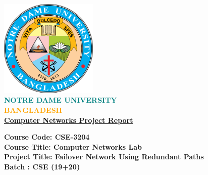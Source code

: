\documentclass[12pt]{report}
\begin{document}
\begin{titlepage}					%
\begin{center}
    \includegraphics[width=0.35\textwidth]{pictures/logo.png} \\
    \vspace{0.5cm}
    \textbf{\Huge \textcolor{teal}{NOTRE DAME} \textcolor{teal}{UNIVERSITY}} \\
    \vspace{0.5cm}
    \textbf{\Huge \textcolor{orange}{BANGLADESH}} \\
    
    \vspace{0.9cm}
    \textbf{\Huge \underline{Computer Networks Project Report}} \\
    
    \vspace{1.5em}
    \begin{flushleft}
    	\textbf{\Large Course Code: CSE-3204} \\
		\vspace{0.3cm}        
        \textbf{\Large Course Title: Computer Networks Lab} \\
        \vspace{0.3cm}
        \textbf{\Large Project Title: Failover Network Using Redundant Paths} \\
		\vspace{0.3cm}        
        \textbf{\Large Batch : CSE (19+20)}        
    \end{flushleft}
    

\end{center}
\end{titlepage}
\end{document}
